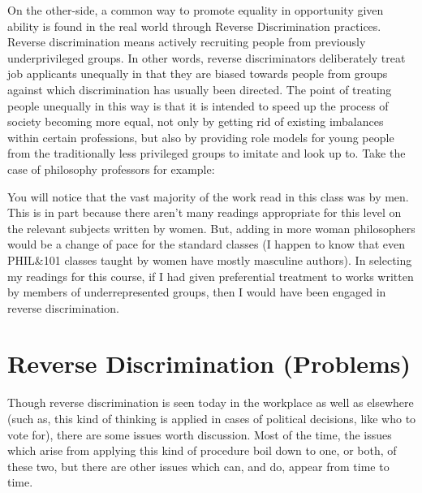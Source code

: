 On the other-side, a common way to promote equality in opportunity given ability is found in the real world through Reverse Discrimination practices. Reverse discrimination means actively recruiting people from previously underprivileged groups. In other words, reverse discriminators deliberately treat job applicants unequally in that they are biased towards people from groups against which discrimination has usually been directed. The point of treating people unequally in this way is that it is intended to speed up the process of society becoming more equal, not only by getting rid of existing imbalances within certain professions, but also by providing role models for young people from the traditionally less privileged groups to imitate and look up to. Take the case of philosophy professors for example:


You will notice that the vast majority of the work read in this class was by men. This is in part because there aren't many readings appropriate for this level on the relevant subjects written by women. But, adding in more woman philosophers would be a change of pace for the standard classes (I happen to know that even PHIL\&101 classes taught by women have mostly masculine authors). In selecting my readings for this course, if I had given preferential treatment to works written by members of underrepresented groups, then I would have been engaged in reverse discrimination.

\section{Reverse Discrimination (Problems)}

Though reverse discrimination is seen today in the workplace as well as elsewhere (such as, this kind of thinking is applied in cases of political decisions, like who to vote for), there are some issues worth discussion. Most of the time, the issues which arise from applying this kind of procedure boil down to one, or both, of these two, but there are other issues which can, and do, appear from time to time.
